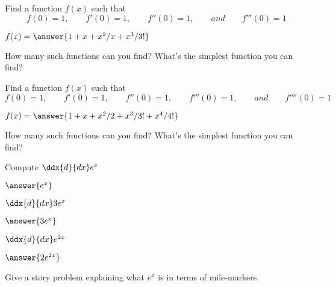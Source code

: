 \documentclass{ximera}
\begin{document}
\begin{question}
  Find a function $f(x)$ such that
  \[
  f(0) = 1,\qquad f'(0) = 1,\qquad f''(0) = 1,\qquad and \qquad f'''(0) = 1
  \]
  \begin{solution}
    $f(x) = \answer{1+x+x^2/x + x^3/3!}$
  \end{solution}
  How many such functions can you find? What's the simplest function you
  can find?
  \begin{solution}
  \end{solution}
\end{question}

\begin{question}
  Find a function $f(x)$ such that
  \[
  f(0) = 1,\qquad f'(0) = 1, \qquad f''(0)=1, \qquad f'''(0) = 1,\qquad and \qquad f''''(0) = 1
  \]
  \begin{solution}
    $f(x) = \answer{1+x+x^2/2+x^3/3!+x^4/4!}$
  \end{solution}
  How many such functions can you find? What's the simplest function you
  can find?
  \begin{solution}
  \end{solution}
\end{question}


\begin{shuffle} 
  \begin{question}
    Compute
    $\ddx{d}{dx} e^x$
    \begin{solution}
      $\answer{e^x}$
    \end{solution}
  \end{question}
  \begin{question}
    $\ddx{d}{dx} 3e^x$
    \begin{solution}
      $\answer{3e^x}$
    \end{solution}
  \end{question}
  \begin{question}
    $\ddx{d}{dx} e^{2x}$
    \begin{solution}
      $\answer{2e^{2x}}$
    \end{solution}
  \end{question}
\end{shuffle}


\begin{question}
  Give a story problem explaining what $e^x$ is in terms of
  mile-markers.
  \begin{solution}
  \end{solution}
\end{question}
\end{document}
